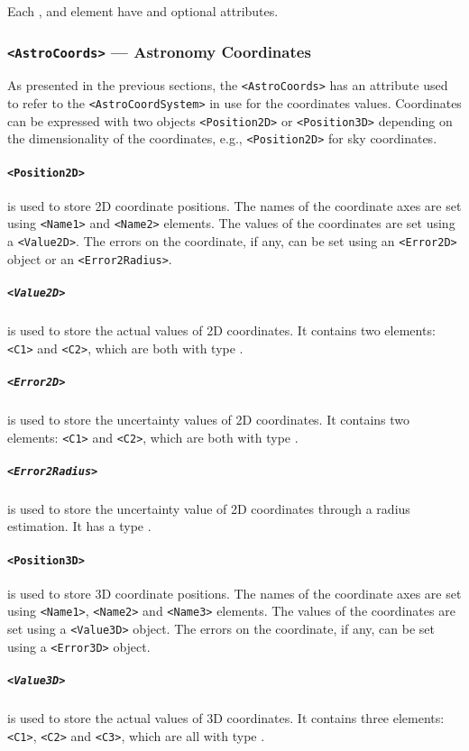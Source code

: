 \documentclass[11pt,a4paper]{ivoa}
\begin{document}
Each ,  and  element have
 and 
optional attributes.

\subsubsection{\texttt{<AstroCoords>} --- Astronomy Coordinates}

As presented in the previous sections, the \verb|<AstroCoords>| has an
attribute  used to refer to the \verb|<AstroCoordSystem>|
in use for the coordinates values. Coordinates can be expressed with two
objects \verb|<Position2D>| or \verb|<Position3D>| depending on the dimensionality
of the coordinates, e.g., \verb|<Position2D>| for sky coordinates.

\paragraph{\texttt{<Position2D>}} is used to store 2D coordinate
positions. The names of the coordinate axes are set using \verb|<Name1>| and
\verb|<Name2>| elements. The values of the coordinates are set using a
\verb|<Value2D>|. The errors on the coordinate, if any, can be set using an
\verb|<Error2D>| object or an \verb|<Error2Radius>|.

\subparagraph{\texttt{<Value2D>}} is used to store the actual values of 2D
coordinates. It contains two elements: \verb|<C1>| and \verb|<C2>|, which are
both with type .

\subparagraph{\texttt{<Error2D>}} is used to store the uncertainty values of 2D
coordinates. It contains two elements: \verb|<C1>| and \verb|<C2>|, which are
both with type .

\subparagraph{\texttt{<Error2Radius>}} is used to store the uncertainty value
of 2D coordinates through a radius estimation. It has a type .

\paragraph{\texttt{<Position3D>}} is used to store 3D coordinate positions. The
names of the coordinate axes are set using \verb|<Name1>|, \verb|<Name2>| and
\verb|<Name3>| elements. The values of the coordinates are set using a
\verb|<Value3D>| object. The errors on the coordinate, if any, can be set using
a \verb|<Error3D>| object.

\subparagraph{\texttt{<Value3D>}} is used to store the actual values of 3D
coordinates. It contains three elements: \verb|<C1>|, \verb|<C2>| and
\verb|<C3>|, which are all with type .
\end{document}
